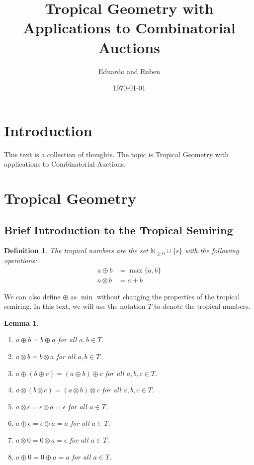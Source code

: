 \documentclass{article}
\title{Tropical Geometry with Applications to Combinatorial Auctions}
\author{Eduardo and Ruben}
\date{\today}
\newcommand{\NN}{\mathbb{N}_{\geq 0}}
\newtheorem{lemma}{Lemma}
\newtheorem{definition}{Definition}
\begin{document}
\maketitle

\section{Introduction}
This text is a collection of thoughts.
The topic is Tropical Geometry with applications to Combinatorial Auctions.


\section{Tropical Geometry}

\subsection{Brief Introduction to the Tropical Semiring}

\begin{definition}
	The tropical numbers are the set $\NN \cup \{\epsilon\}$ with the following operations:
	\begin{align*}
		a \oplus b  & = \max\{a,b\} \\
		a \otimes b & = a + b
	\end{align*}
\end{definition}

We can also define $\oplus$ as $\min$ without changing the properties of the tropical semiring.
In this text, we will use the notation $T$ to denote the tropical numbers.

\begin{lemma}
	\begin{enumerate}
		\item $a \oplus b = b \oplus a$ for all $a,b \in T$.
		\item $a \otimes b = b \otimes a$ for all $a,b \in T$.
		\item $a \oplus (b \oplus c) = (a \oplus b) \oplus c$ for all $a,b,c \in T$.
		\item $a \otimes (b \otimes c) = (a \otimes b) \otimes c$ for all $a,b,c \in T$.
		\item $a \otimes \epsilon = \epsilon \otimes a = \epsilon$ for all $a \in T$.
		\item $a \oplus \epsilon = \epsilon \oplus a = a$ for all $a \in T$.
		\item $a \otimes 0 = 0 \otimes a = \epsilon$ for all $a \in T$.
		\item $a \oplus 0 = 0 \oplus a = a$ for all $a \in T$.
	\end{enumerate}
\end{lemma}
\end{document}

